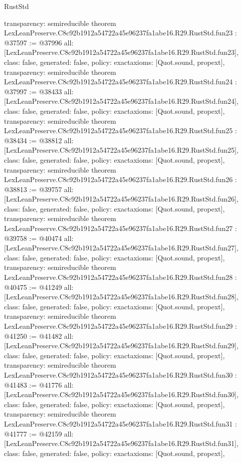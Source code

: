 \begin{lexlean}{RustStd}
\begin{coremodule}
{  transparency: semireducible
}
theorem LexLeanPreserve.C8c92b1912a54722a45e96237fa1abe16.R29.RustStd.fun23 : @37597 := @37996 {
  all: [LexLeanPreserve.C8c92b1912a54722a45e96237fa1abe16.R29.RustStd.fun23],
  class: false,
  generated: false,
  policy: exact{axioms: [Quot.sound, propext]},
  transparency: semireducible
}
theorem LexLeanPreserve.C8c92b1912a54722a45e96237fa1abe16.R29.RustStd.fun24 : @37997 := @38433 {
  all: [LexLeanPreserve.C8c92b1912a54722a45e96237fa1abe16.R29.RustStd.fun24],
  class: false,
  generated: false,
  policy: exact{axioms: [Quot.sound, propext]},
  transparency: semireducible
}
theorem LexLeanPreserve.C8c92b1912a54722a45e96237fa1abe16.R29.RustStd.fun25 : @38434 := @38812 {
  all: [LexLeanPreserve.C8c92b1912a54722a45e96237fa1abe16.R29.RustStd.fun25],
  class: false,
  generated: false,
  policy: exact{axioms: [Quot.sound, propext]},
  transparency: semireducible
}
theorem LexLeanPreserve.C8c92b1912a54722a45e96237fa1abe16.R29.RustStd.fun26 : @38813 := @39757 {
  all: [LexLeanPreserve.C8c92b1912a54722a45e96237fa1abe16.R29.RustStd.fun26],
  class: false,
  generated: false,
  policy: exact{axioms: [Quot.sound, propext]},
  transparency: semireducible
}
theorem LexLeanPreserve.C8c92b1912a54722a45e96237fa1abe16.R29.RustStd.fun27 : @39758 := @40474 {
  all: [LexLeanPreserve.C8c92b1912a54722a45e96237fa1abe16.R29.RustStd.fun27],
  class: false,
  generated: false,
  policy: exact{axioms: [Quot.sound, propext]},
  transparency: semireducible
}
theorem LexLeanPreserve.C8c92b1912a54722a45e96237fa1abe16.R29.RustStd.fun28 : @40475 := @41249 {
  all: [LexLeanPreserve.C8c92b1912a54722a45e96237fa1abe16.R29.RustStd.fun28],
  class: false,
  generated: false,
  policy: exact{axioms: [Quot.sound, propext]},
  transparency: semireducible
}
theorem LexLeanPreserve.C8c92b1912a54722a45e96237fa1abe16.R29.RustStd.fun29 : @41250 := @41482 {
  all: [LexLeanPreserve.C8c92b1912a54722a45e96237fa1abe16.R29.RustStd.fun29],
  class: false,
  generated: false,
  policy: exact{axioms: [Quot.sound, propext]},
  transparency: semireducible
}
theorem LexLeanPreserve.C8c92b1912a54722a45e96237fa1abe16.R29.RustStd.fun30 : @41483 := @41776 {
  all: [LexLeanPreserve.C8c92b1912a54722a45e96237fa1abe16.R29.RustStd.fun30],
  class: false,
  generated: false,
  policy: exact{axioms: [Quot.sound, propext]},
  transparency: semireducible
}
theorem LexLeanPreserve.C8c92b1912a54722a45e96237fa1abe16.R29.RustStd.fun31 : @41777 := @42159 {
  all: [LexLeanPreserve.C8c92b1912a54722a45e96237fa1abe16.R29.RustStd.fun31],
  class: false,
  generated: false,
  policy: exact{axioms: [Quot.sound, propext]},
}
\end{coremodule}
\end{lexlean}
